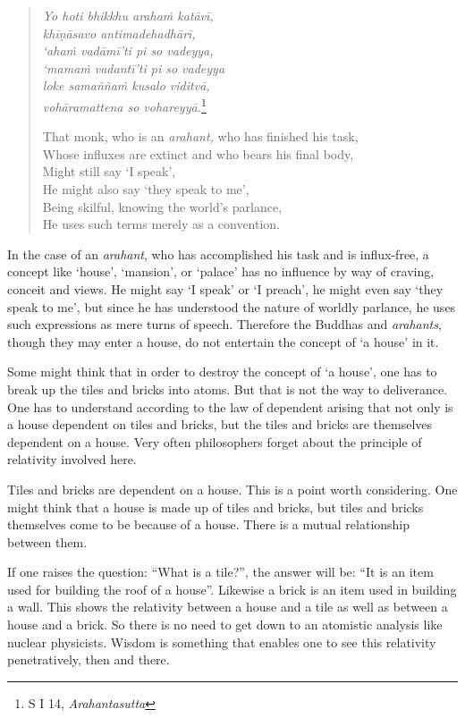 \clearpage

\begin{quote}
\emph{Yo hoti bhikkhu arahaṁ katāvī,}\\
\emph{khīṇāsavo antimadehadhārī,}\\
\emph{`ahaṁ vadāmī'ti pi so vadeyya,}\\
\emph{`mamaṁ vadantī'ti pi so vadeyya}\\
\emph{loke samaññaṁ kusalo viditvā,}\\
\emph{vohāramattena so vohareyyā.}\footnote{S I 14, \emph{Arahantasutta}}

That monk, who is an \emph{arahant,} who has finished his task,\\
Whose influxes are extinct and who bears his final body,\\
Might still say `I speak',\\
He might also say `they speak to me',\\
Being skilful, knowing the world's parlance,\\
He uses such terms merely as a convention.
\end{quote}

In the case of an \emph{arahant}, who has accomplished his task and is influx-free, a concept like `house', `mansion', or `palace' has no influence by way of craving, conceit and views. He might say `I speak' or `I preach', he might even say `they speak to me', but since he has understood the nature of worldly parlance, he uses such expressions as mere turns of speech. Therefore the Buddhas and \emph{arahants}, though they may enter a house, do not entertain the concept of `a house' in it.

Some might think that in order to destroy the concept of `a house', one has to break up the tiles and bricks into atoms. But that is not the way to deliverance. One has to understand according to the law of dependent arising that not only is a house dependent on tiles and bricks, but the tiles and bricks are themselves dependent on a house. Very often philosophers forget about the principle of relativity involved here.

Tiles and bricks are dependent on a house. This is a point worth considering. One might think that a house is made up of tiles and bricks, but tiles and bricks themselves come to be because of a house. There is a mutual relationship between them.

If one raises the question: ``What is a tile?'', the answer will be: ``It is an item used for building the roof of a house''. Likewise a brick is an item used in building a wall. This shows the relativity between a house and a tile as well as between a house and a brick. So there is no need to get down to an atomistic analysis like nuclear physicists. Wisdom is something that enables one to see this relativity penetratively, then and there.

